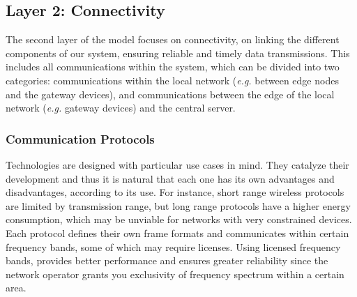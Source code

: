 
\subsection{Layer 2: Connectivity}
\label{sec:iot-model-layer2}

The second layer of the model focuses on connectivity, on linking the different components of our system, ensuring reliable and timely data transmissions. This includes all communications within the system, which can be divided into two categories: communications within the local network (\textit{e.g.} between edge nodes and the gateway devices), and communications between the edge of the local network (\textit{e.g.} gateway devices) and the central server. \bigskip

\subsubsection{Communication Protocols}

Technologies are designed with particular use cases in mind. They catalyze their development and thus it is natural that each one has its own advantages and disadvantages, according to its use. For instance, short range wireless protocols are limited by transmission range, but long range protocols have a higher energy consumption, which may be unviable for networks with very constrained devices. Each protocol defines their own frame formats and communicates within certain frequency bands, some of which may require licenses. Using licensed frequency bands, provides better performance and ensures greater reliability since the network operator grants you exclusivity of frequency spectrum within a certain area. \bigskip


